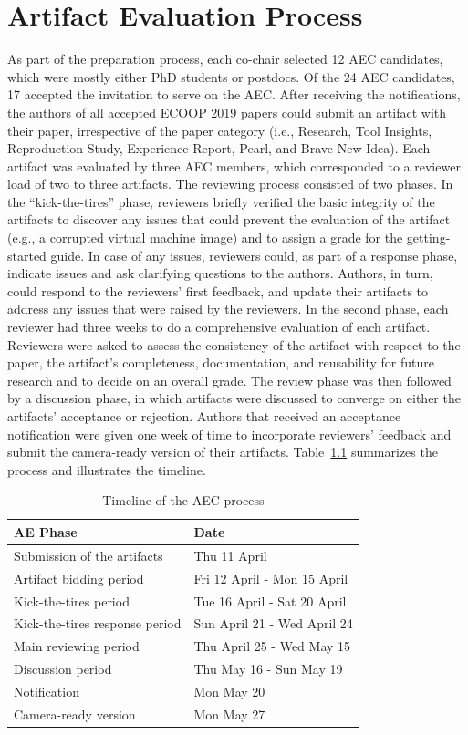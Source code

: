 \documentclass[a4paper,UKenglish]{dartsmaster-v2019}
\begin{document}
\chapter{Artifact Evaluation Process}

As part of the preparation process, each co-chair selected 12 AEC candidates, which were mostly either PhD students or postdocs.
Of the 24 AEC candidates, 17 accepted the invitation to serve on the AEC.
After receiving the notifications, the authors of all accepted ECOOP 2019 papers could submit an artifact with their paper, irrespective of the paper category (i.e., Research, Tool Insights, Reproduction Study, Experience Report, Pearl, and Brave New Idea).
Each artifact was evaluated by three AEC members, which corresponded to a reviewer load of two to three artifacts.
The reviewing process consisted of two phases.
In the ``kick-the-tires'' phase, reviewers briefly verified the basic integrity of the artifacts to discover any issues that could prevent the evaluation of the artifact (e.g., a corrupted virtual machine image) and to assign a grade for the getting-started guide.
In case of any issues, reviewers could, as part of a response phase, indicate issues and ask clarifying questions to the authors.
Authors, in turn, could respond to the reviewers' first feedback, and update their artifacts to address any issues that were raised by the reviewers.
In the second phase, each reviewer had three weeks to do a comprehensive evaluation of each artifact.
Reviewers were asked to assess the consistency of the artifact with respect to the paper, the artifact's completeness, documentation, and reusability for future research and to decide on an overall grade.
The review phase was then followed by a discussion phase, in which artifacts were discussed to converge on either the artifacts' acceptance or rejection.
Authors that received an acceptance notification were given one week of time to incorporate reviewers' feedback and submit the camera-ready version of their artifacts.
Table~\ref{aeprocess} summarizes the process and illustrates the timeline.
\\ 
\begin{table}[h!]
	\center{}
	\caption{Timeline of the AEC process}
	\label{aeprocess}
	\begin{tabular}{l l}
	\toprule
	AE Phase & Date\\
	\midrule
	Submission of the artifacts & Thu 11 April\\
	Artifact bidding period & Fri 12 April - Mon 15 April\\
	Kick-the-tires period & Tue 16 April - Sat 20 April\\
	Kick-the-tires response period & Sun April 21 - Wed April 24\\
	Main reviewing period & Thu April 25 - Wed May 15\\
	Discussion period & Thu May 16 - Sun May 19\\
	Notification & Mon May 20\\
	Camera-ready version & Mon May 27\\
	\bottomrule
	\end{tabular}
\end{table}
\end{document}
